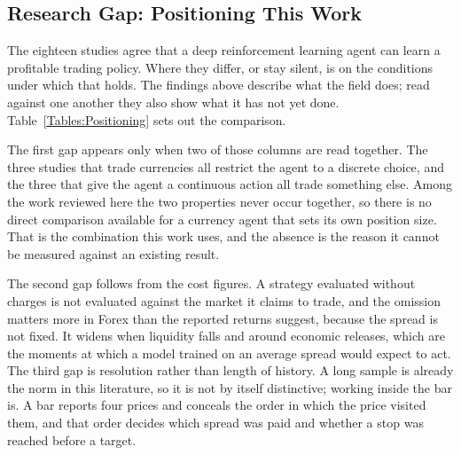 \subsection{Research Gap: Positioning This Work}

The eighteen studies agree that a deep reinforcement learning agent can learn a profitable trading policy. Where they differ, or stay silent, is on the conditions under which that holds. The findings above describe what the field does; read against one another they also show what it has not yet done. Table~\ref{Tables:Positioning} sets out the comparison.



The first gap appears only when two of those columns are read together. The three studies that trade currencies \cite{carapuco_reinforcement_2018, huang_financial_2018, rundo_deep_2019} all restrict the agent to a discrete choice, and the three that give the agent a continuous action \cite{majidi_algorithmic_2022, jia_lstm-ddpg_2021, zhang_deep_2020} all trade something else. Among the work reviewed here the two properties never occur together, so there is no direct comparison available for a currency agent that sets its own position size. That is the combination this work uses, and the absence is the reason it cannot be measured against an existing result.

The second gap follows from the cost figures. A strategy evaluated without charges is not evaluated against the market it claims to trade, and the omission matters more in Forex than the reported returns suggest, because the spread is not fixed. It widens when liquidity falls and around economic releases, which are the moments at which a model trained on an average spread would expect to act. The third gap is resolution rather than length of history. A long sample is already the norm in this literature, so it is not by itself distinctive; working inside the bar is. A bar reports four prices and conceals the order in which the price visited them, and that order decides which spread was paid and whether a stop was reached before a target.

